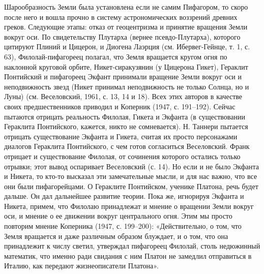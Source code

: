 Шарообразность  Земли  была  установлена   если  не  самим  Пифагором,
то  скоро  после  него  и   вошла  прочно  в  систему  астрономических
воззрений  древних  греков.  Следующие этапы:  отказ  от  геоцентризма
и  принятие  вращения  Земли  вокруг оси.  По  свидетельству  Плутарха
(вернее  псевдо-Плутарха),  которого  цитируют  Плиний  и  Цицерон,  и
Диогена Лаэрция (см. Ибервег-Гейнце,  т. 1, с. 63), Филолай-пифагореец
полагал, что Земля вращается кругом огня по наклонной круговой орбите,
Никет-сиракузянин (у Цицерона Гикет), Гераклит Понтийский и пифагореец
Экфант  принимали  вращение Земли  вокруг  оси  и неподвижность  звезд
(Никет  принимал  неподвижность не  только  Солнца,  но и  Луны)  (см.
Веселовский,  1961, с.  13, 14  и 18).  Всех этих  авторов в  качестве
своих  предшественников  приводил  и  Коперник  (1947,  с.  191--192).
Сейчас  пытаются  отрицать реальность  Филолая,  Гикета  и Экфанта  (в
существовании Гераклита  Понтийского, кажется, никто  не сомневается).
Н. Таннери  пытается отрицать  существование Экфанта и  Гикета, считая
их  просто персонажами  диалогов  Гераклита Понтийского,  с чем  готов
согласиться Веселовский.  Франк отрицает  и существование  Филолая, от
сочинения  которого остались  только  отрывки;  этот вывод  оспаривает
Веселовский (с.  14). Но если  и не было  Экфанта и Никета,  то кто-то
высказал эти  замечательные мысли, и для  нас важно, что все  они были
пифагорейцами.  О Гераклите  Понтийском, ученике  Платона, речь  будет
дальше. Он дал дальнейшее развитие  теории. Пока же, игнорируя Экфанта
и Никета,  примем, что Филолаю  принадлежат и мнение о  вращении Земли
вокруг оси, и  мнение о ее движении вокруг центрального  огня. Этим мы
просто повторим мнение Коперника  (1947, с. 199--200): «Действительно,
о том, что Земля вращается и даже различным образом блуждает, и о том,
что  она принадлежит  к  числу светил,  утверждал пифагореец  Филолай,
столь недюжинный математик,  что именно ради свидания с  ним Платон не
замедлил отправиться в Италию, как передают жизнеописатели Платона».

